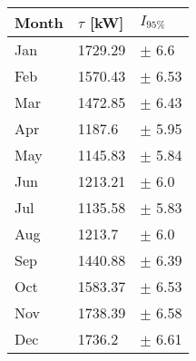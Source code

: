 \begin{tabular}{lll}
\toprule
Month & $\tau$ [kW] &   $I_{95\%}$ \\
\midrule
  Jan &     1729.29 &    $\pm$ 6.6 \\
  Feb &     1570.43 &   $\pm$ 6.53 \\
  Mar &     1472.85 &   $\pm$ 6.43 \\
  Apr &      1187.6 &   $\pm$ 5.95 \\
  May &     1145.83 &   $\pm$ 5.84 \\
  Jun &     1213.21 &    $\pm$ 6.0 \\
  Jul &     1135.58 &   $\pm$ 5.83 \\
  Aug &      1213.7 &    $\pm$ 6.0 \\
  Sep &     1440.88 &   $\pm$ 6.39 \\
  Oct &     1583.37 &   $\pm$ 6.53 \\
  Nov &     1738.39 &   $\pm$ 6.58 \\
  Dec &      1736.2 &   $\pm$ 6.61 \\
\bottomrule
\end{tabular}
